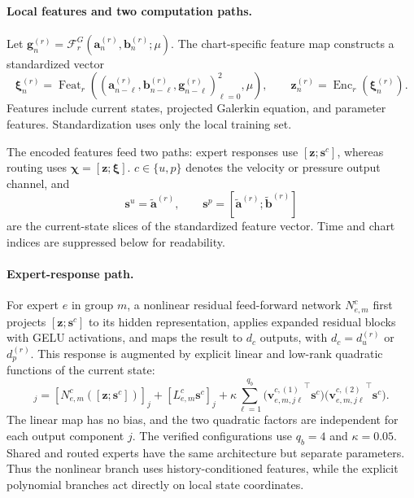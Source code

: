 \paragraph{Local features and two computation paths.}
Let $\bm g_n^{(r)}=
\mathcal F_r^G(\bm a_n^{(r)},\bm b_n^{(r)};\mu)$.
The chart-specific feature map constructs a standardized vector
\begin{equation}
  \bm\xi_n^{(r)}
  =\operatorname{Feat}_r\!\left(
    (\bm a_{n-\ell}^{(r)},\bm b_{n-\ell}^{(r)},
     \bm g_{n-\ell}^{(r)})_{\ell=0}^{2},\mu\right),
  \qquad
  \bm z_n^{(r)}=\operatorname{Enc}_r(\bm\xi_n^{(r)}).
  \label{eq:main_specialist_features}
\end{equation}
Features include current states, projected Galerkin equation, 
and parameter features. Standardization uses only the local
training set. 

The encoded features feed two paths: expert responses use
$[\bm z;\bm s^c]$, whereas routing uses
$\bm\chi=[\bm z;\bm\xi]$.  $c\in\{u,p\}$ denotes the velocity or pressure output channel, and
\begin{equation}
  \bm s^u=\widetilde{\bm a}^{(r)},
  \qquad
  \bm s^p=[\widetilde{\bm a}^{(r)};
            \widetilde{\bm b}^{(r)}]
  \label{eq:main_expert_state_inputs}
\end{equation}
are the current-state slices of the standardized feature vector. Time and chart indices are suppressed below for readability.

\paragraph{Expert-response path.}
For expert $e$ in group $m$, a nonlinear residual feed-forward
network $N_{e,m}^c$ first projects $[\bm z;\bm s^c]$ to its hidden representation, applies expanded residual blocks with GELU activations, and maps the result to $d_c$ outputs, with
$d_c=d_u^{(r)}$ or $d_p^{(r)}$.
This response is augmented by explicit linear and low-rank quadratic functions of the current state:
\begin{equation}
  [E_{e,m}^c(\bm z,\bm s^c)]_j
  =[N_{e,m}^c([\bm z;\bm s^c])]_j
   +[L_{e,m}^c\bm s^c]_j
   +\kappa\sum_{\ell=1}^{q_b}
    \bigl({\bm v_{e,m,j\ell}^{c,(1)}}^\top\bm s^c\bigr)
    \bigl({\bm v_{e,m,j\ell}^{c,(2)}}^\top\bm s^c\bigr).
  \label{eq:main_structured_expert}
\end{equation}
The linear map has no bias, and the two quadratic factors are
independent for each output component $j$. The verified configurations use $q_b=4$ and $\kappa=0.05$. Shared and routed experts have the same architecture but separate parameters. Thus the nonlinear branch uses history-conditioned features, while the explicit polynomial
branches act directly on local state coordinates.

